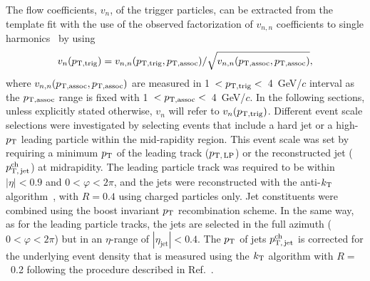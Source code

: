 

The flow coefficients, $v_{n}$, of the trigger particles, can be extracted from the template fit with the use of the observed factorization of $v_{n,n}$ coefficients to single harmonics~\cite{ATLAS:2015hzw,ATLAS:2016yzd} by using
\begin{eqnarray}
v_{n}(p_{\rm{T,trig}}) = v_{n,n}(p_{\rm{T,trig}}, p_{\rm{T,assoc}}) / \sqrt{ v_{n,n}(p_{\rm{T,assoc}},p_{\rm{T,assoc}})},
\end{eqnarray}
where $v_{n,n}(p_{\rm{T,assoc}}, p_{\rm{T,assoc}})$ are measured in 1~$<p_{\rm{T,trig}}<$~4~GeV/$c$ interval as the $p_{\rm{T,assoc}}$ range is fixed with 1~$<p_{\rm{T,assoc}}<$~4~GeV/$c$. In the following sections, unless explicitly stated otherwise, $v_n$ will refer to $v_n(p_{\rm{T,trig}})$.
Different event scale selections were investigated by selecting events that include a hard jet or a high-$p_\mathrm{T}$ leading particle within the mid-rapidity region.
This event scale was set by requiring a minimum $p_\mathrm{T}$ of the leading track ($p_\mathrm{T,\,LP}$) or the reconstructed jet ($p_\mathrm{T,\,jet}^\mathrm{ch}$) at midrapidity. The leading particle track was required to be within $|\eta|<0.9$ and $0<\varphi<2\pi$, and the jets were reconstructed with the anti-$k_{\rm{T}}$ algorithm~\cite{Cacciari:2008gp,Cacciari:2011ma}, with $R=0.4$ using charged particles only. Jet constituents were combined using the boost invariant $p_\mathrm{T}$ recombination scheme. In the same way, as for the leading particle tracks, the jets are selected in the full azimuth ($0<\varphi<2\pi$) but in an $\eta$-range of $|\eta_\mathrm{jet}|<0.4$. The $p_\mathrm{T}$ of jets $p_\mathrm{T,\,jet}^\mathrm{ch}$ is corrected for the underlying event density that is measured using the $k_{\rm{T}}$ algorithm with $R=$~0.2 following the procedure described in Ref.~\cite{Acharya:2018eat}.

